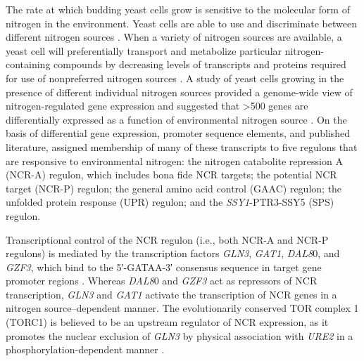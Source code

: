 The rate at which budding yeast cells grow is sensitive to the
molecular form of nitrogen in the environment. Yeast cells are able to
use and discriminate between different nitrogen sources 
\parencite{cooper1982nitrogen,magasanik2002nitrogen}. 
When a variety of nitrogen sources are
available, a yeast cell will preferentially transport and metabolize
particular nitrogen-containing compounds by decreasing levels of
transcripts and proteins required for use of nonpreferred nitrogen
sources 
\parencite{cooper1982nitrogen,magasanik2002nitrogen}. 
A study of yeast
cells growing in the presence of different individual nitrogen sources
provided a genome-wide view of nitrogen-regulated gene expression and
suggested that >500 genes are differentially expressed as a function
of environmental nitrogen source 
\parencite{godard2007effect}. On the basis
of differential gene expression, promoter sequence elements, and
published literature, \cite{godard2007effect} assigned membership of many
of these transcripts to five regulons that are responsive to
environmental nitrogen: the nitrogen catabolite repression A (NCR-A)
regulon, which includes bona fide NCR targets; the potential NCR
target (NCR-P) regulon; the general amino acid control (GAAC) regulon;
the unfolded protein response (UPR) regulon; and the \textit{SSY1}-PTR3-SSY5
(SPS) regulon.

Transcriptional control of the NCR regulon (i.e., both NCR-A and NCR-P
regulons) is mediated by the transcription factors 
\textit{GLN3}, \textit{GAT1}, \textit{DAL8}0,
and \textit{GZF3}, which bind to the 5′-GATAA-3′ consensus sequence in target
gene promoter regions 
\parencite{cooper1982nitrogen,magasanik2002nitrogen}. 
Whereas \textit{DAL8}0 and \textit{GZF3} act as repressors of 
NCR transcription, \textit{GLN3}
and \textit{GAT1} activate the transcription of NCR genes in a nitrogen
source–dependent manner. The evolutionarily conserved TOR complex 1
(TORC1) is believed to be an upstream regulator of NCR expression, as
it promotes the nuclear exclusion of \textit{GLN3} by physical association with
\textit{URE2} in a phosphorylation-dependent manner
\parencite{beck1999tor}.

